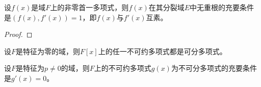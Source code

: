 \begin{theorem}
	设$f(x)$是域$F$上的非零首一多项式，则$f(x)$在其分裂域$E$中无重根的充要条件是$(f(x),f'(x))=1$，即$f(x)$与$f'(x)$互素。
\end{theorem}

\begin{proof}
	
\end{proof}


\begin{corollary}
	设$F$是特征为零的域，则$F[x]$上的任一不可约多项式都是可分多项式。	
\end{corollary}


\begin{corollary}
	设$F$是特征为$p\neq 0$的域，则$F$上的不可约多项式$g(x)$为不可分多项式的充要条件是$g'(x)=0$。	
\end{corollary}

	


















